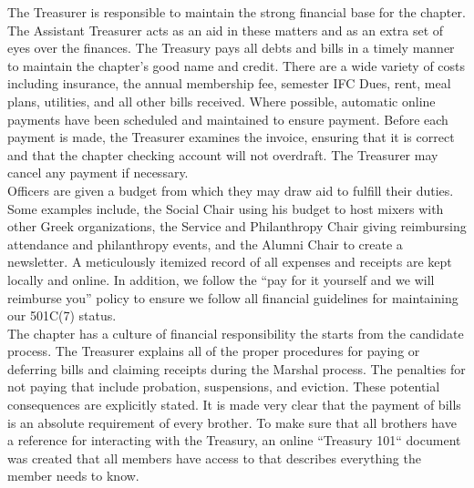     The Treasurer is responsible to maintain the strong financial base for the chapter. The Assistant Treasurer acts as an aid in these matters and as an extra set of eyes over the finances. The Treasury pays all debts and bills in a timely manner to maintain the chapter’s good name and credit. There are a wide variety of costs including insurance, the annual membership fee, semester IFC Dues, rent, meal plans, utilities, and all other bills received. Where possible, automatic online payments have been scheduled and maintained to ensure payment. Before each payment is made, the Treasurer examines the invoice, ensuring that it is correct and that the chapter checking account will not overdraft. The Treasurer may cancel any payment if necessary. \\

    Officers are given a budget from which they may draw aid to fulfill their duties. Some examples include, the Social Chair using his budget to host mixers with other Greek organizations, the Service and Philanthropy Chair giving reimbursing attendance and philanthropy events, and the Alumni Chair to create a newsletter. A meticulously itemized record of all expenses and receipts are kept locally and online. In addition, we follow the ``pay for it yourself and we will reimburse you'' policy to ensure we follow all financial guidelines for maintaining our 501C(7) status. \\

    The chapter has a culture of financial responsibility the starts from the candidate process. The Treasurer explains all of the proper procedures for paying or deferring bills and claiming receipts during the Marshal process. The penalties for not paying that include probation, suspensions, and eviction. These potential consequences are explicitly stated. It is made very clear that the payment of bills is an absolute requirement of every brother. To make sure that all brothers have a reference for interacting with the Treasury, an online ``Treasury 101`` document was created that all members have access to that describes everything the member needs to know. \\

